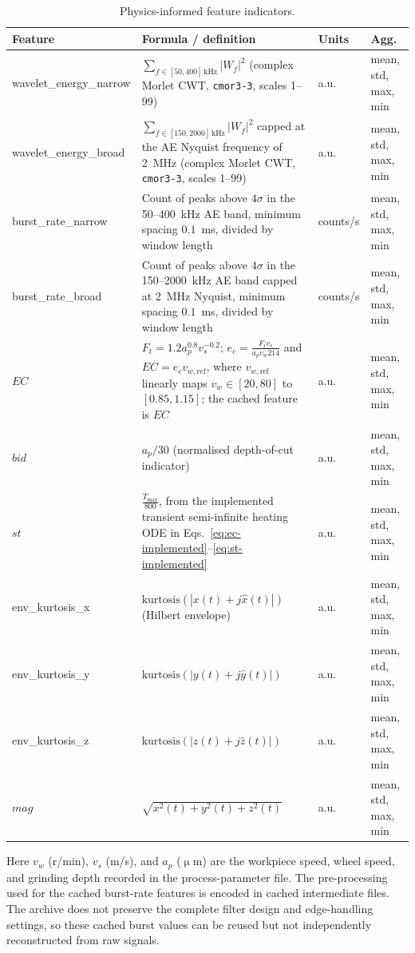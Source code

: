 \begin{table}[htbp]
\centering
\caption{Physics-informed feature indicators.}\label{tab:physics_features}
\begin{tabular}{@{}p{2.6cm}p{7.2cm}ll@{}}
\toprule
Feature & Formula / definition & Units & Agg. \\
\midrule
wavelet\_energy\_narrow & $\sum_{f\in[50,400]\,\text{kHz}} |W_f|^2$ (complex Morlet CWT, \texttt{cmor3-3}, scales 1--99) & a.u. & mean, std, max, min \\
wavelet\_energy\_broad & $\sum_{f\in[150,2000]\,\text{kHz}} |W_f|^2$ capped at the AE Nyquist frequency of 2~MHz (complex Morlet CWT, \texttt{cmor3-3}, scales 1--99) & a.u. & mean, std, max, min \\
burst\_rate\_narrow & Count of peaks above $4\sigma$ in the 50--400~kHz AE band, minimum spacing $0.1$~ms, divided by window length & counts/s & mean, std, max, min \\
burst\_rate\_broad & Count of peaks above $4\sigma$ in the 150--2000~kHz AE band capped at 2~MHz Nyquist, minimum spacing $0.1$~ms, divided by window length & counts/s & mean, std, max, min \\
$EC$ & $F_t=1.2 a_p^{0.8} v_s^{-0.2}$; $e_c=\frac{F_t v_s}{a_p v_w 214}$ and $EC=e_c v_{w,\text{ref}}$, where $v_{w,\text{ref}}$ linearly maps $v_w\in[20,80]$ to $[0.85,1.15]$; the cached feature is $EC$ & a.u. & mean, std, max, min \\
$bid$ & $a_p / 30$ (normalised depth-of-cut indicator) & a.u. & mean, std, max, min \\
$st$ & $\frac{T_{\max}}{800}$, from the implemented transient semi-infinite heating ODE in Eqs.~\eqref{eq:ec-implemented}--\eqref{eq:st-implemented} & a.u. & mean, std, max, min \\
env\_kurtosis\_x & $\text{kurtosis}(|x(t)+j\hat x(t)|)$ (Hilbert envelope) & a.u. & mean, std, max, min \\
env\_kurtosis\_y & $\text{kurtosis}(|y(t)+j\hat y(t)|)$ & a.u. & mean, std, max, min \\
env\_kurtosis\_z & $\text{kurtosis}(|z(t)+j\hat z(t)|)$ & a.u. & mean, std, max, min \\
$mag$ & $\sqrt{x^2(t)+y^2(t)+z^2(t)}$ & a.u. & mean, std, max, min \\
\bottomrule
\end{tabular}
\end{table}

Here $v_w$ (r/min), $v_s$ (m/s), and $a_p$ (\(\upmu\)m) are the workpiece
speed, wheel speed, and grinding depth recorded in the process-parameter
file. The pre-processing used for the cached burst-rate features is
encoded in cached intermediate files. The archive does not preserve the
complete filter design and edge-handling settings, so these cached burst
values can be reused but not independently reconstructed from raw signals.

